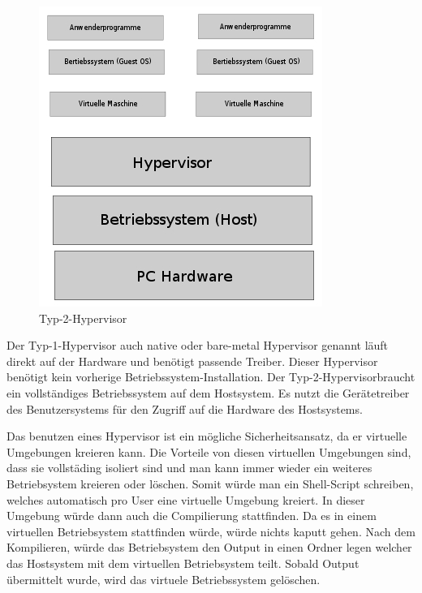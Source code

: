 \documentclass[10pt]{article}
\begin{document}
\begin{figure}[H]
\begin{minipage}[H]{0.4\textwidth}
    \includegraphics[width=\textwidth]{Bilder/hypervisorTyp2.jpg}
    \caption{Typ-2-Hypervisor}
  \end{minipage}
\end{figure}
	
	Der Typ-1-Hypervisor auch native oder bare-metal Hypervisor genannt läuft direkt auf der Hardware und benötigt passende Treiber. Dieser Hypervisor benötigt kein vorherige Betriebssystem-Installation. 
	Der Typ-2-Hypervisorbraucht ein vollständiges Betriebssystem auf dem Hostsystem. Es nutzt die Gerätetreiber des Benutzersystems für den Zugriff auf die Hardware des Hostsystems. 
	
	Das benutzen eines Hypervisor ist ein mögliche Sicherheitsansatz, da er virtuelle Umgebungen kreieren kann. Die Vorteile von diesen virtuellen Umgebungen sind, dass sie vollstäding isoliert sind und man kann immer wieder ein weiteres Betriebsystem kreieren oder löschen. Somit würde man ein Shell-Script schreiben, welches automatisch pro User eine virtuelle Umgebung kreiert. In dieser Umgebung würde dann auch die Compilierung stattfinden. Da es in einem virtuellen Betriebsystem stattfinden würde, würde nichts kaputt gehen. Nach dem Kompilieren, würde das Betriebsystem den Output in einen Ordner legen welcher das Hostsystem mit dem virtuellen Betriebsystem teilt. Sobald Output übermittelt wurde, wird das virtuele Betriebssystem gelöschen.
	
\end{document}
